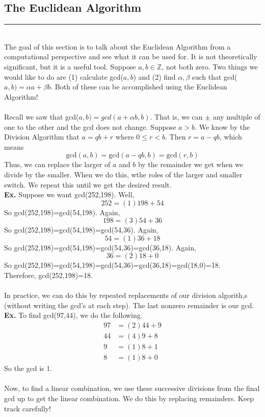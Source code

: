 \documentclass[class=article, crop=false]{standalone}
\def\integers{{\mathbb Z}}
\begin{document}
\subsection{The Euclidean Algorithm}
\rule{\textwidth}{1pt}\\
The goal of this section is to talk about the Euclidean Algorithm from a computational perspective and see what it can
be used for. It is not theoretically significant, but it is a useful tool. Suppose $a,b\in\integers$, not both
zero. Two things we would like to do are (1) calculate gcd($a,b$) and (2) find $\alpha, \beta$ such that 
gcd($a,b) = \alpha a+ \beta b$. Both of these can be accomplished using the Euclidean Algorithm!\\\\
Recall we saw that gcd($a,b)=gcd(a+\alpha b, b)$. That is, we can $\pm$ any multiple of one to the other
and the gcd does not change. Suppose $a>b$. We know by the Division Algorithm that $a=qb+r$ where $0\leq r<b$.
Then $r=a-qb$, which means $$\text{gcd}(a,b)=\text{gcd}(a-qb, b)=\text{gcd}(r,b)$$
Thus, we can replace the larger of $a$ and $b$ by the remainder we get when we divide by the smaller.
When we do this, wthe roles of the larger and smaller switch. We repeat this until we get the desired result.\\
\textbf{Ex.} Suppose we want gcd(252,198). Well, $$252=(1)198 + 54$$ So gcd(252,198)=gcd(54,198). Again,
$$198=(3)54 + 36$$ So gcd(252,198)=gcd(54,198)=gcd(54,36). Again,
$$54 = (1)36+18$$ So gcd(252,198)=gcd(54,198)=gcd(54,36)=gcd(36,18). Again,
$$36=(2)18+0$$ So gcd(252,198)=gcd(54,198)=gcd(54,36)=gcd(36,18)=gcd(18,0)=18.\\
Therefore, gcd(252,198)=18.\\\\
In practice, we can do this by repeated replacements of our division algorith,s (without writing the gcd's at
each step). The last nonzero remainder is our gcd.\\
\textbf{Ex.} To find gcd(97,44), we do the following.
\begin{align*}
	97 &= (2)44 +9\\
	44 &= (4)9 +8\\
	9 &= (1)8 +1\\
	8 &= (1)8 + 0
\end{align*}
So the gcd is 1.\\\\
Now, to find a linear combination, we use these successive divisions from the final gcd up to get the linear
combination. We do this by replacing remainders. Keep track carefully!\\
\end{document}
